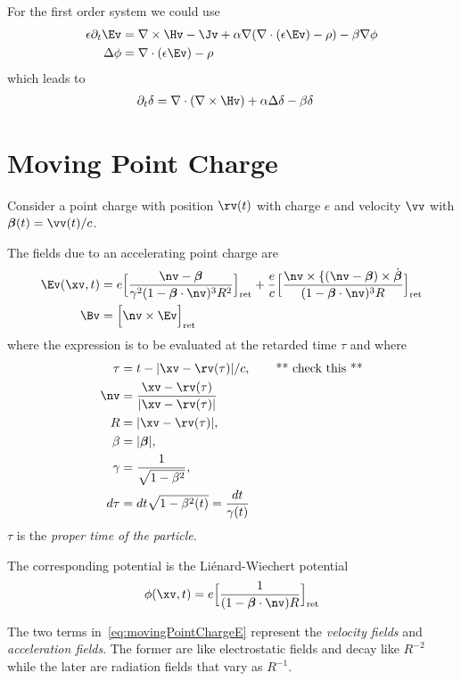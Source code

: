 \documentclass[12pt]{article}
\newcommand{\grad}{\nabla}
\begin{document}
For the first order system we could use
\begin{align}
   \eps\partial_t \Ev &=  \grad\times\Hv - \Jv +\alpha\grad( \grad\cdot(\eps\Ev)-\rho )
                    -\beta\grad\phi \\
    \Delta \phi &= \grad\cdot(\eps\Ev)-\rho
\end{align}
which leads to 
\begin{align}
 \partial_t \delta &= \grad\cdot(\grad\times\Hv) 
                 +\alpha \Delta \delta
                 -\beta \delta
\end{align}


\clearpage
\section{Moving Point Charge}

Consider a point charge with position $\rv(t)$ with charge $e$ and velocity $\vv$
with $\betav(t)=\vv(t)/c$.


The fields due to an accelerating point charge are~\cite{Jackson}
\begin{align}
 \Ev(\xv,t)&= e\Big[ {\nv-\betav \over \gamma^2(1-\betav\cdot\nv)^3 R^2 }\Big]_{\rm ret}
    +{e\over c}\Big[ {\nv\times\{ (\nv-\betav)\times\dot{\betav}
                  \over (1-\betav\cdot\nv)^3 R } \Big]_{\rm ret} \label{eq:movingPointChargeE}\\
 \Bv&=\Big[ \nv\times\Ev \Big]_{\rm ret}
\end{align}
where the expression is to be evaluated at the retarded time $\tau$ and where
\begin{align}
  \tau &= t - \vert \xv-\rv(\tau)\vert/c , \qquad\mbox{** check this **} \\
 \nv &= { \xv-\rv(\tau) \over \vert \xv-\rv(\tau) \vert} \\
 R & =\vert \xv-\rv(\tau)\vert, \\
 \beta &=\vert \betav \vert ,\\
 \gamma &= {1\over \sqrt{ 1-\beta^2} }, \\
 d\tau &= dt\sqrt{1-\beta^2(t)} = {dt\over \gamma(t)}
\end{align}
$\tau$ is the {\em proper time of the particle}.

The corresponding potential is the Li\'enard-Wiechert potential
\[
   \phi(\xv,t) = e\Big[ {1\over (1-\betav\cdot\nv)R }\Big]_{\rm ret}
\]

The two terms in~\eqref{eq:movingPointChargeE} represent the {\em velocity fields}
and {\em acceleration fields}. The former are like electrostatic fields and
decay like $R^{-2}$ while the later are radiation fields that vary as $R^{-1}$.
\end{document}
